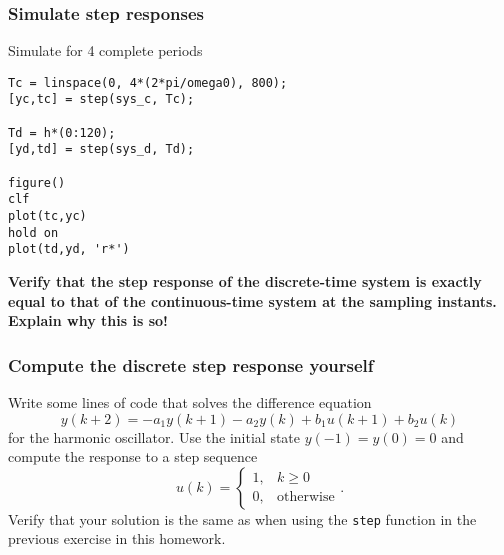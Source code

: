 \documentclass[a4paper]{scrartcl}
\begin{document}
\subsubsection*{Simulate step responses}
\label{sec-1-2-2}
Simulate for 4 complete periods 
\begin{verbatim}
Tc = linspace(0, 4*(2*pi/omega0), 800);
[yc,tc] = step(sys_c, Tc);

Td = h*(0:120);
[yd,td] = step(sys_d, Td);

figure()
clf
plot(tc,yc)
hold on
plot(td,yd, 'r*')
\end{verbatim}

\textbf{Verify that the step response of the discrete-time system is exactly equal to that of the continuous-time system at the sampling instants. Explain why this is so!}

\subsubsection*{Compute the discrete step response yourself}
\label{sec-1-2-3}
 Write some lines of code that solves the difference equation
 \[ y(k+2) = -a_1y(k+1) - a_2y(k) + b_1u(k+1) + b_2u(k) \]
 for the harmonic oscillator. 
Use the initial state \(y(-1)=y(0)=0\) and compute the response to a step sequence 
 \[ u(k) = \begin{cases} 1, & k \ge 0\\ 0, & \text{otherwise} \end{cases}.\]
 Verify that your solution is the same as when using the \texttt{step} function in the previous exercise in this homework.
\end{document}
